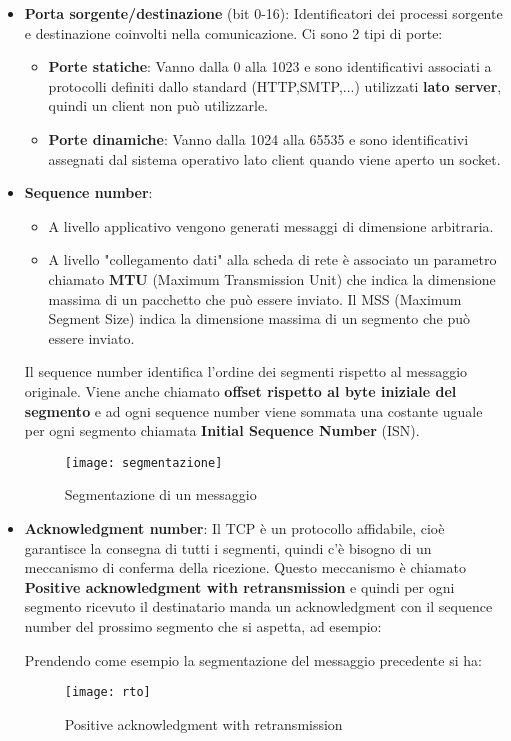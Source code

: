 \documentclass[a4paper]{article}
\begin{document}
\begin{itemize}
  \item \textbf{Porta sorgente/destinazione} (bit 0-16): Identificatori dei processi 
    sorgente e destinazione coinvolti nella comunicazione. Ci sono 2 tipi di porte:
    \begin{itemize}
      \item \textbf{Porte statiche}: Vanno dalla 0 alla 1023 e sono identificativi
        associati a protocolli definiti dallo standard (HTTP,SMTP,...) utilizzati
        \textbf{lato server}, quindi un client non può utilizzarle.

      \item \textbf{Porte dinamiche}: Vanno dalla 1024 alla 65535 e sono identificativi
        assegnati dal sistema operativo lato client quando viene aperto un socket.
    \end{itemize}

  \item \textbf{Sequence number}: 
    \begin{itemize}
      \item A livello applicativo vengono generati messaggi di
        dimensione arbitraria.
      \item A livello "collegamento dati" alla scheda di rete è associato un parametro
        chiamato \textbf{MTU} (Maximum Transmission Unit) che indica la dimensione
        massima di un pacchetto che può essere inviato. Il MSS (Maximum Segment Size)
        indica la dimensione massima di un segmento che può essere inviato.
    \end{itemize}
    Il sequence number identifica l'ordine dei segmenti rispetto al messaggio originale.
    Viene anche chiamato \textbf{offset rispetto al byte iniziale del segmento} e ad
    ogni sequence number viene sommata una costante uguale per ogni segmento chiamata
    \textbf{Initial Sequence Number} (ISN).
    \begin{figure}[H]
      \centering
      \texttt{[image: segmentazione]}
      \caption{Segmentazione di un messaggio}
    \end{figure}

  \item \textbf{Acknowledgment number}: Il TCP è un protocollo affidabile, cioè garantisce
    la consegna di tutti i segmenti, quindi c'è bisogno di un meccanismo di conferma
    della ricezione. Questo meccanismo è chiamato \textbf{Positive acknowledgment with
    retransmission} e quindi per ogni segmento ricevuto il destinatario manda un
    acknowledgment con il sequence number del prossimo segmento che si aspetta, ad
    esempio:
    \begin{example}
      Prendendo come esempio la segmentazione del messaggio precedente si ha:
      \begin{figure}[H]
        \centering
        \texttt{[image: rto]}
        \caption{Positive acknowledgment with retransmission}
      \end{figure}
    \end{example}


\end{itemize}
\end{document}
